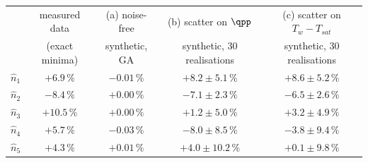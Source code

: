 \begin{tabular}{@{}l c c c c@{}}
\toprule
 & measured data & (a) noise-free & (b) scatter on $\qpp$ & (c) scatter on $T_w-T_{sat}$\\
 & (exact minima) & synthetic, GA & synthetic, 30 realisations & synthetic, 30 realisations\\
\midrule
$\hat n_1$ & $+6.9\,\%$ & $-0.01\,\%$ & $+8.2\pm5.1\,\%$ & $+8.6\pm5.2\,\%$\\
$\hat n_2$ & $-8.4\,\%$ & $+0.00\,\%$ & $-7.1\pm2.3\,\%$ & $-6.5\pm2.6\,\%$\\
$\hat n_3$ & $+10.5\,\%$ & $+0.00\,\%$ & $+1.2\pm5.0\,\%$ & $+3.2\pm4.9\,\%$\\
$\hat n_4$ & $+5.7\,\%$ & $-0.03\,\%$ & $-8.0\pm8.5\,\%$ & $-3.8\pm9.4\,\%$\\
$\hat n_5$ & $+4.3\,\%$ & $+0.01\,\%$ & $+4.0\pm10.2\,\%$ & $+0.1\pm9.8\,\%$\\
\bottomrule
\end{tabular}
